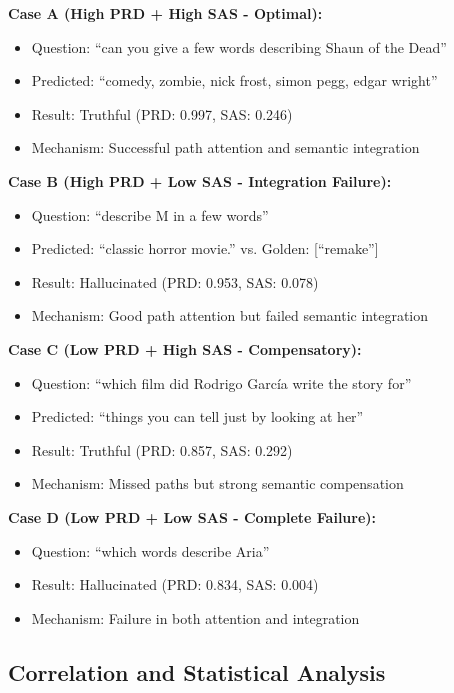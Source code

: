 \textbf{Case A (High PRD + High SAS - Optimal):}
\begin{itemize}
    \item Question: ``can you give a few words describing Shaun of the Dead''
    \item Predicted: ``comedy, zombie, nick frost, simon pegg, edgar wright''
    \item Result: Truthful (PRD: 0.997, SAS: 0.246)
    \item Mechanism: Successful path attention and semantic integration
\end{itemize}

\textbf{Case B (High PRD + Low SAS - Integration Failure):}
\begin{itemize}
    \item Question: ``describe M in a few words''
    \item Predicted: ``classic horror movie.'' vs. Golden: [``remake'']
    \item Result: Hallucinated (PRD: 0.953, SAS: 0.078)
    \item Mechanism: Good path attention but failed semantic integration
\end{itemize}

\textbf{Case C (Low PRD + High SAS - Compensatory):}
\begin{itemize}
    \item Question: ``which film did Rodrigo García write the story for''
    \item Predicted: ``things you can tell just by looking at her''
    \item Result: Truthful (PRD: 0.857, SAS: 0.292)
    \item Mechanism: Missed paths but strong semantic compensation
\end{itemize}

\textbf{Case D (Low PRD + Low SAS - Complete Failure):}
\begin{itemize}
    \item Question: ``which words describe Aria''
    \item Result: Hallucinated (PRD: 0.834, SAS: 0.004)
    \item Mechanism: Failure in both attention and integration
\end{itemize}

\subsection{Correlation and Statistical Analysis}


